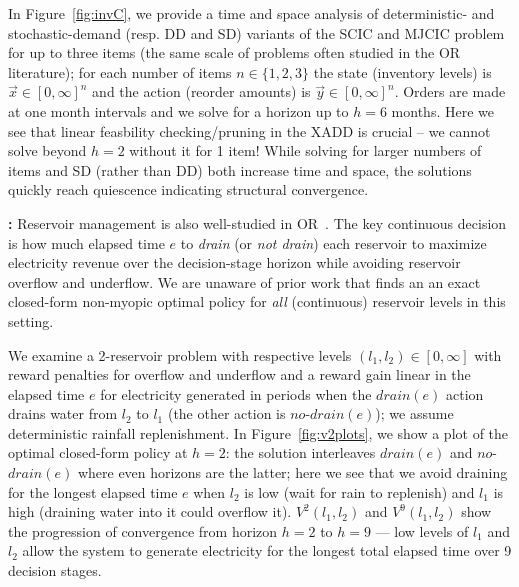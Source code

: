 In Figure~\ref{fig:invC}, we provide a time and space analysis of
deterministic- and stochastic-demand (resp. DD and SD) variants of the
SCIC and MJCIC problem for up to three items (the same scale of
problems often studied in the OR literature); for each number of items
$n \in \{ 1,2,3 \}$ the state (inventory levels) is $\vec{x} \in
[0,\infty]^n$ and the action (reorder amounts) is $\vec{y} \in
[0,\infty]^n$.  Orders are made at one month intervals and we solve
for a horizon up to $h=6$ months.  Here we see that linear feasbility
checking/pruning in the XADD is crucial -- we cannot solve beyond
$h=2$ without it for 1 item!  While solving for larger numbers of
items and SD (rather than DD) both increase time and space, 
the solutions quickly reach quiescence indicating structural
convergence.


{\bf \WaterReservoir:} Reservoir management is also well-studied in
OR~\cite{Mahootchi2009,Yeh1985}.  The key continuous decision is how
much elapsed time $e$ to
\emph{drain} (or \emph{not drain}) each reservoir to maximize
electricity revenue over the decision-stage horizon while avoiding
reservoir overflow and underflow.  We are unaware of prior work that
finds an an exact closed-form non-myopic optimal policy for \emph{all}
(continuous) reservoir levels in this setting.

We examine a 2-reservoir problem with
respective levels $(l_1,l_2)\in [0,\infty]$ with reward penalties for 
overflow and underflow and a reward gain linear in the elapsed time $e$ for
electricity generated in periods when the $\mathit{drain}(e)$ action
drains water from $l_2$ to $l_1$ (the other action is 
$\mathit{no}$-$\mathit{drain}(e)$); we assume deterministic rainfall
replenishment.  In Figure~\ref{fig:v2plots}, we show a plot of 
the optimal closed-form policy
at $h=2$: the solution interleaves $\mathit{drain}(e)$ and 
$\mathit{no}$-$\mathit{drain}(e)$ where even horizons are the latter;
here we see that we avoid draining for the longest elapsed time $e$ 
when $l_2$ is low (wait for rain to replenish) and $l_1$ is high (draining
water into it could overflow it).  $V^2(l_1,l_2)$ and $V^9(l_1,l_2)$
show the progression of convergence from horizon $h=2$ to $h=9$ ---
low levels of $l_1$ and $l_2$ allow the system to generate electricity
for the longest total elapsed time over 9 decision stages.


